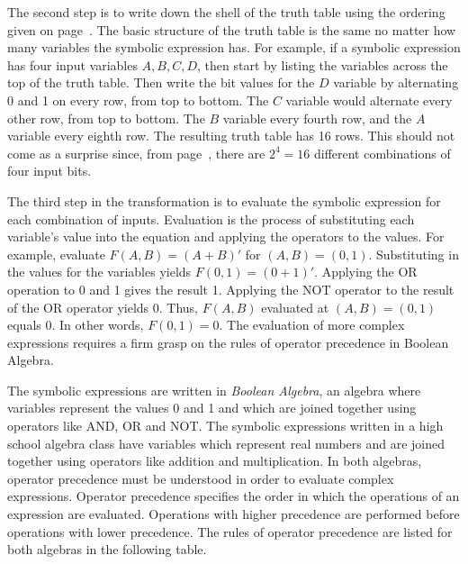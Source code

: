 The second step is to write down the shell of the truth table using the
ordering given on page~\pageref{page:TTshell}.  The basic structure of the
truth table is the same no matter how many variables the symbolic 
expression has.  
For example, if a symbolic expression has four input variables $A,B,C,D$,
then start by listing the variables across the top of the truth table.  
Then write the bit values for the $D$ variable by alternating 0
and 1 on every row, from top to bottom. The $C$ variable would alternate 
every other row, from top to bottom.  The $B$ variable every
fourth row, and the $A$ variable every eighth row.  The resulting 
truth table has 16 rows.  This should not come as a surprise since,
from page~\pageref{page:two-to-N}, there are 
$2^4=16$ different combinations of four input bits.

The third step in the transformation is to evaluate the symbolic 
expression for each combination of inputs.  Evaluation is the process
of substituting each variable's value into the equation and applying 
the operators to the values.  For example, evaluate $F(A,B) = (A+B)'$
for $(A,B) = (0,1)$.  Substituting in the values for the variables
yields $F(0,1) = (0+1)'$.  Applying the OR operation to 0 and 1 gives the 
result 1.  Applying the NOT operator to the result of the OR operator yields 0.
Thus, $F(A,B)$ evaluated at $(A,B)=(0,1)$ equals 0.  In other words,
$F(0,1)=0$.  The evaluation of more complex expressions requires 
a firm grasp on the rules of operator precedence in Boolean Algebra.

The symbolic expressions are written in 
{\it Boolean Algebra},  an algebra where variables
represent the values 0 and 1 and which are joined together using operators 
like AND, OR and NOT.  The symbolic expressions written in a 
high school algebra class have variables which represent real numbers and
are joined together using operators like addition and multiplication.  In 
both algebras, operator precedence must be understood in order to evaluate
complex expressions.  Operator precedence specifies the order in which the
operations of an expression are evaluated.  Operations with higher precedence
are performed before operations with lower precedence.  The rules of operator 
precedence are listed for both algebras in the following table.

